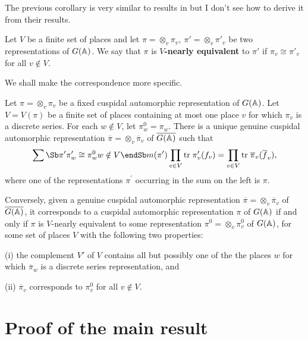 The previous corollary is very similar to results in
\cite{LL} but I don't see how to derive it from their
results.

\begin{definition} Let $V$ be a finite set of places and let
$\pi =\otimes _v\pi _v,\ \pi' =\otimes _v\pi' _v$ be two
representations of $G({\Bbb{A}})$.
We say that $\pi$ is {\bf $V$-nearly equivalent} to $\pi'$ if
$\pi_v\cong \pi'_v$ for all $v\notin V$.
\end{definition}

We shall make the correspondence more specific.

\begin{corollary}
Let $\pi =\otimes _v\pi _v$ be a fixed cuspidal automorphic representation
of $G({\Bbb A})$.
Let $V=V(\pi)$ be a finite set of places containing at most one
place $v$ for which $\pi_v$ is a discrete series.
For each $w\notin V$, let $\pi _w^0=\pi _w$. There is a
unique genuine cuspidal automorphic representation $\overline{\pi }=\otimes
_v\overline{\pi }_v$ of $\overline{G({\Bbb A})}$ such that 
\[
\sum\Sb \pi ^{\prime } \\ \pi _w^{\prime }\cong \pi _w^0 \\
w\notin V \endSb
m(\pi ^{\prime })\prod_{v\in V}
{\rm tr}\;\pi _v^{\prime }(f_v)
=\prod_{v\in V}{\rm tr}\;\overline{\pi }_v(\overline{f}_v),
\]
where one of the representations $\pi ^{\prime }$ occurring in the sum on
the left is $\pi $.

Conversely, given a genuine cuspidal automorphic
representation $\overline{\pi }=\otimes _v\overline{\pi }_v$ of
$\overline{G({\Bbb A})}$, it corresponds to a cuspidal automorphic
representation $\pi $
of $G({\Bbb A})$ if and only if $\pi $ is $V$-nearly equivalent to
some representation $\pi^0=\otimes _v \pi^0_v$ of
$G({\Bbb{A}})$, for some set of places $V$ with the following
two properties:

(i) the complement $V'$ of $V$ contains all but possibly one of the
the places $w$ for which $\overline{\pi}_w$ is a discrete
series representation, and

(ii) $\overline{\pi}_v$ corresponds to $\pi_v^0$ for all $v\notin V$.
\end{corollary}

\section{Proof of the main result}

